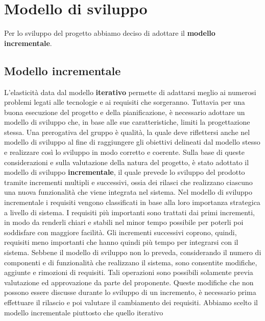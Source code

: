 \chapter{Modello di sviluppo}\label{ModelloDiSviluppo}
Per lo sviluppo del progetto abbiamo deciso di adottare il \textbf{modello incrementale}.
\section{Modello incrementale}\label{ModelloDiSviluppoModelloIncrementale}
L'elasticità data dal modello \textbf{iterativo} permette di adattarsi meglio ai numerosi problemi legati alle tecnologie e ai requisiti che sorgeranno.
Tuttavia per una buona esecuzione del progetto e della pianificazione, è necessario adottare un modello di sviluppo che, in base alle sue caratteristiche, limiti la progettazione stessa. Una prerogativa del gruppo è qualità, la quale deve riflettersi anche nel modello di sviluppo al fine di raggiungere gli obiettivi delineati dal modello stesso e realizzare così lo sviluppo in modo corretto e coerente.
Sulla base di queste considerazioni e sulla valutazione della natura del progetto, è stato adottato il modello di sviluppo \textbf{incrementale}, il quale prevede lo sviluppo del prodotto tramite incrementi multipli e successivi, ossia dei rilasci che realizzano ciascuno una nuova funzionalità che viene integrata nel sistema.
Nel modello di sviluppo incrementale i requisiti vengono classificati in base alla loro importanza strategica a livello di sistema. I requisiti più importanti sono trattati dai primi incrementi, in modo da renderli chiari e stabili nel minor tempo possibile per poterli poi soddisfare con maggiore facilità.
Gli incrementi successivi coprono, quindi, requisiti meno importanti che hanno quindi più tempo per integrarsi con il sistema.
Sebbene il modello di sviluppo non lo preveda, considerando il numero di componenti e di funzionalità che realizzano il sistema, sono consentite modifiche, aggiunte e rimozioni di requisiti.
Tali operazioni sono possibili solamente previa valutazione ed approvazione da parte del proponente. Queste modifiche che non possono essere discusse durante lo sviluppo di un incremento, è necessario prima effettuare il rilascio e poi valutare il cambiamento dei requisiti.
Abbiamo scelto il modello incrementale piuttosto che quello iterativo

